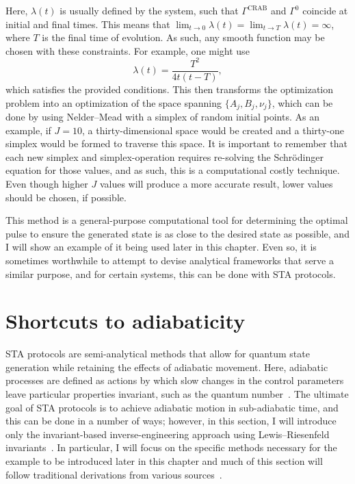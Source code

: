 \noindent Here, $\lambda(t)$ is usually defined by the system, such that $\Gamma^{\text{CRAB}}$ and $\Gamma^0$ coincide at initial and final times.
This means that $\lim_{t\rightarrow 0} \lambda(t) = \lim_{t\rightarrow T}\lambda(t) = \infty$, where $T$ is the final time of evolution.
As such, any smooth function may be chosen with these constraints.
For example, one might use
\begin{equation}
\lambda(t) = \frac{T^2}{4t(t-T)},
\end{equation}
\noindent which satisfies the provided conditions.
This then transforms the optimization problem into an optimization of the space spanning $\{A_j, B_j, \nu_j\}$, which can be done by using Nelder--Mead with a simplex of random initial points.
As an example, if $J = 10$, a thirty-dimensional space would be created and a thirty-one simplex would be formed to traverse this space.
It is important to remember that each new simplex and simplex-operation requires re-solving the Schr\"odinger equation for those values, and as such, this is a computational costly technique.
Even though higher $J$ values will produce a more accurate result, lower values should be chosen, if possible.

This method is a general-purpose computational tool for determining the optimal pulse to ensure the generated state is as close to the desired state as possible, and I will show an example of it being used later in this chapter.
Even so, it is sometimes worthwhile to attempt to devise analytical frameworks that serve a similar purpose, and for certain systems, this can be done with STA protocols.

\section{Shortcuts to adiabaticity}

STA protocols are semi-analytical methods that allow for quantum state generation while retaining the effects of adiabatic movement.
Here, adiabatic processes are defined as actions by which slow changes in the control parameters leave particular properties invariant, such as the quantum number~\cite{guery2019}.
The ultimate goal of STA protocols is to achieve adiabatic motion in sub-adiabatic time, and this can be done in a number of ways; however, in this section, I will introduce only the invariant-based inverse-engineering approach using Lewis--Riesenfeld invariants~\cite{torrontegui2013}.
In particular, I will focus on the specific methods necessary for the example to be introduced later in this chapter and much of this section will follow traditional derivations from various sources~\cite{torrontegui2013,guery2019, schloss2016}.

